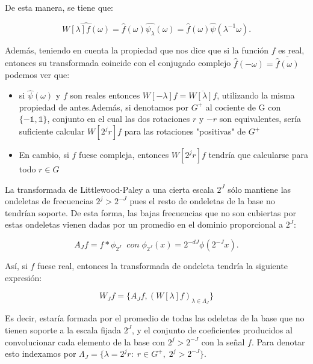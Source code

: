 De esta manera, se tiene que: 

$$\widehat{W[\lambda]f(\omega)}=\widehat{f}(\omega)\widehat{\psi_\lambda}(\omega)=\widehat{f}(\omega)\widehat{\psi}(\lambda^{-1}\omega).$$

\noindent Además, teniendo en cuenta la propiedad que nos dice que si la función $f$ es real, entonces su transformada coincide con el conjugado complejo $\widehat{f}(-\omega)=\overline{\widehat{f}(\omega)}$ podemos ver que: 

\begin{itemize}
  \item si $\widehat{\psi}(\omega)$ y $f$ son reales entonces $W[-\lambda]f= \overline{W[\lambda]f}$, utilizando la misma propiedad de antes.Además, si denotamos por $G^{+}$ al cociente de G con $\lbrace-\mathbb{1},\mathbb{1}\rbrace$, conjunto en el cual las dos rotaciones $r$ y $-r$ son equivalentes, sería suficiente calcular $W[2^jr]f$ para las rotaciones "positivas" de $G^{+}$
  \item En cambio, si $f$ fuese compleja, entonces $W[2^jr]f$ tendría que calcularse para todo $r \in G$
\end{itemize}

\medskip
 
\noindent La transformada de Littlewood-Paley a una cierta escala $2^J$ sólo mantiene las ondeletas de frecuencias $2^j>2^{-J}$ pues el resto de ondeletas de la base no tendrían soporte. De esta forma, las bajas frecuencias que no son cubiertas por estas ondeletas vienen dadas por un promedio en el dominio proporcional a $2^J$:

\begin{equation}
  A_Jf=f \ast \phi_ {2^J} \; \; con \; \phi_ {2^J}(x)=2^{-dJ} \phi(2^{-J}x).
\end{equation}

\medskip

\noindent Así, si $f$ fuese real, entonces la transformada de ondeleta tendría la siguiente expresión: 

$$W_J f=\lbrace A_Jf,(W[\lambda]f)_{\lambda \in \Lambda_J} \rbrace$$ 

\noindent Es decir, estaría formada por el promedio de todas las odeletas de la base que no tienen soporte a la escala fijada $2^J$, y el conjunto de coeficientes producidos al convolucionar cada elemento de la base con $2^j>2^{-J}$ con la señal $f$. Para denotar esto indexamos por $\Lambda_J=\lbrace \lambda=2^jr:\;r\in G^{+}, \; 2^j>2^{-J}\rbrace$. 

\medskip

